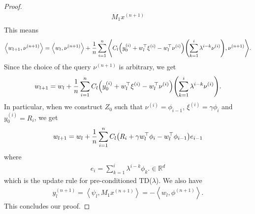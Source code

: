 \documentclass{article}
\newcommand{\R}{\mathbb{R}}
\newcommand{\indot}[2]{{\left<#1, #2\right>}}
\begin{document}
\begin{proof}
\begin{align}
            {M_1 x^{(n+1)}}\\
        \end{align}
        This means
        \begin{align}
            \indot{w_{l+1}}{\nu^{(n+1)}}
            = \indot{w_l}{\nu^{(n+1)}}
            + \frac{1}{n} \sum_{i=1}^n
            \indot{C_l \qty(y_0^{(i)} + w_l^\top \xi^{(i)} - w_l^\top \nu^{(i)})\qty(\sum_{k=1} ^i \lambda^{i-k} \nu^{(i)})}{
            \nu^{(n+1)}}.
        \end{align}
        Since the choice of the query $\nu^{(n+1)}$ is arbitrary, we get
        \begin{align}
            w_{l+1} = w_l + \frac{1}{n}\sum_{i=1}^n C_l \qty(y_0^{(i)} + w_l^\top \xi^{(i)} - w_l^\top \nu^{(i)})\qty(\sum_{k=1} ^i \lambda^{i-k} \nu^{(i)}).
        \end{align}
        In particular, when we construct $Z_0$ such that $\nu^{(i)} = \phi_{i-1}$, $\xi^{(i)} = \gamma \phi_i$ and $y_0^{(i)} = R_i$,
        we get
        \begin{align}
            w_{l+1} = w_l + \frac{1}{n}\sum_{i=1}^n C_l \qty(R_i + \gamma w_l^\top \phi_i - w_l^\top \phi_{i-1}) e_{i-1}
        \end{align}
        where
        \begin{align}
            e_i = \sum_{k=1}^i \lambda^{i-k} \phi_k. \in \R^d
        \end{align}
        which is the update rule for pre-conditioned TD($\lambda$).
        We also have
        \begin{align}
            y_l^{(n+1)}
            = \indot{\psi_l}{M_1 x^{(n+1)}}
            = -\indot{w_l}{\phi^{(n+1)}}.
        \end{align}
        This concludes our proof.
\end{proof}
\end{document}
